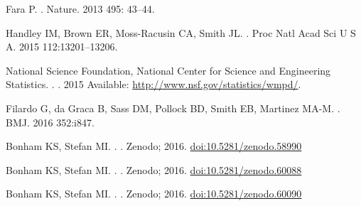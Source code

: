\documentclass[10pt,letterpaper]{article}
\begin{document}
\begin{flushleft}
\begin{thebibliography}{10}
Fara P.
.
\newblock Nature. 2013  495: 43–44.

Handley IM, Brown ER, Moss-Racusin CA, Smith JL. 
.
\newblock  Proc Natl Acad Sci U S A.  2015 112:13201–13206.


National Science Foundation, National Center for Science and Engineering Statistics.
.
\newblock  [Internet]. 2015 Available: \url{http://www.nsf.gov/statistics/wmpd/}.

 Filardo G, da Graca B, Sass DM, Pollock BD, Smith EB, Martinez MA-M. 
.
\newblock BMJ. 2016 352:i847.


Bonham KS, Stefan MI.
.
\newblock   [Internet]. Zenodo; 2016. \url{doi:10.5281/zenodo.58990}

Bonham KS, Stefan MI.
.
\newblock  [Internet]. Zenodo; 2016. \url{doi:10.5281/zenodo.60088}

 Bonham KS, Stefan MI.
.
\newblock  [Internet]. Zenodo; 2016. \url{doi:10.5281/zenodo.60090}

 



\end{thebibliography}





\end{flushleft}
\end{document}
